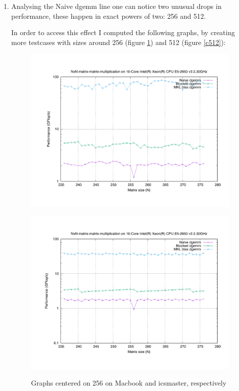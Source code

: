 \documentclass[unicode,11pt,a4paper,oneside,numbers=endperiod,openany]{scrartcl}
\begin{document}
\begin{enumerate}
            
        \item %
            Analysing the Naive dgemm line one can notice two unusual drops in performance, these happen in exact powers of two: 256 and 512.
            
            In order to access this effect I computed the following graphs, by creating more testcases with sizes around 256 (figure \ref{c256}) and 512 (figure \ref{c512}):

            \begin{figure}[H]
                \begin{minipage}{.5\textwidth}
                    \centering
                    \includegraphics[width=\linewidth]{256_mac}
                    \label{c256_mac}
                \end{minipage}%
                \begin{minipage}{.5\textwidth}
                    \centering
                    \includegraphics[width=\linewidth]{256_icsmaster} 
                    \label{c256_icsmaster}
                \end{minipage}
                \caption{Graphs centered on 256 on Macbook and icsmaster, respectively}
                \label{c256}
            \end{figure}



\end{enumerate}
\end{document}

